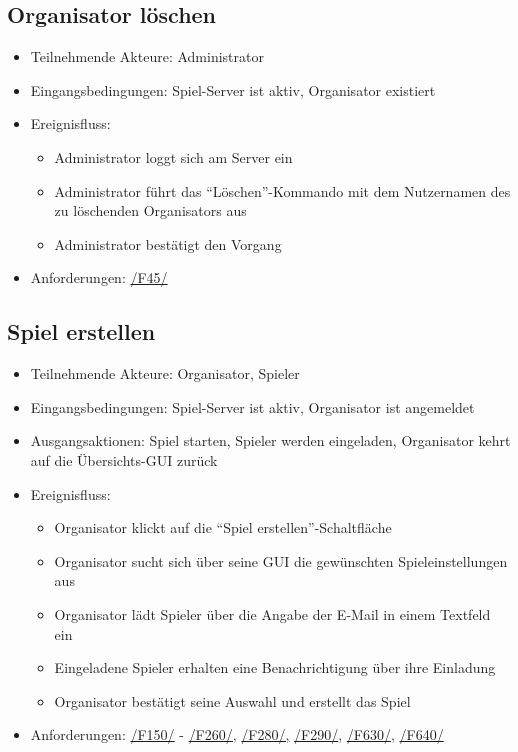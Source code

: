 \documentclass[a4paper]{scrreprt}
\begin{document}
    \subsection{Organisator löschen}
    \begin{itemize}
        \item Teilnehmende Akteure: \Gls{Administrator}
        \item Eingangsbedingungen: \Gls{Spiel-Server} ist aktiv, \Gls{Organisator} existiert
        \item Ereignisfluss:
        \begin{itemize}
            \item \Gls{Administrator} loggt sich am Server ein
            \item \Gls{Administrator} führt das \enquote{Löschen}-Kommando mit dem Nutzernamen des zu löschenden \Gls{Organisator}s aus
            \item \Gls{Administrator} bestätigt den Vorgang
        \end{itemize}
        \item Anforderungen: \hyperlink{F45}{/F45/}
    \end{itemize}

    \subsection{Spiel erstellen}
    \begin{itemize}
        \item Teilnehmende Akteure: \Gls{Organisator}, \Gls{Spieler}
        \item Eingangsbedingungen: \Gls{Spiel-Server} ist aktiv, \Gls{Organisator} ist angemeldet
        \item Ausgangsaktionen: \Gls{Spiel} starten, \Gls{Spieler} werden eingeladen, \Gls{Organisator} kehrt auf die Übersichts-GUI zurück
        \item Ereignisfluss:
        \begin{itemize}
            \item \Gls{Organisator} klickt auf die \enquote{Spiel erstellen}-Schaltfläche
            \item \Gls{Organisator} sucht sich über seine GUI die gewünschten \Gls{Spieleinstellungen} aus
            \item \Gls{Organisator} lädt \Gls{Spieler} über die Angabe der E-Mail in einem Textfeld ein
            \item Eingeladene \Gls{Spieler} erhalten eine Benachrichtigung über ihre Einladung
            \item \Gls{Organisator} bestätigt seine Auswahl und erstellt das Spiel
        \end{itemize}
        \item Anforderungen: \hyperlink{F150}{/F150/} - \hyperlink{F260}{/F260/,} \hyperlink{F280}{/F280/,} \hyperlink{F290}{/F290/}, \hyperlink{F630}{/F630/}, \hyperlink{F640}{/F640/}
    \end{itemize}
\end{document}

